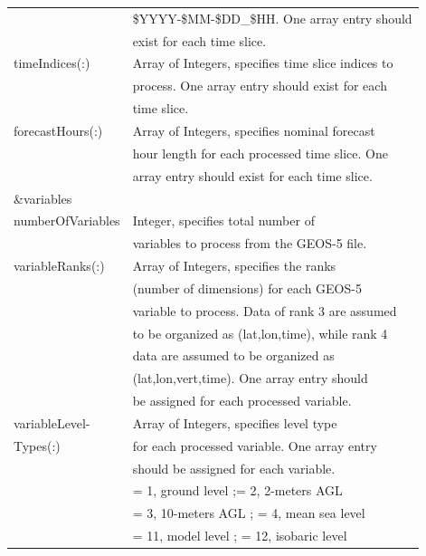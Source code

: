 \begin{tabular}{|l|l|}
& \$YYYY-\$MM-\$DD\_\$HH. One array entry should \\
& exist for each time slice. \\ \hline
timeIndices(:) & Array of Integers, specifies time slice indices to \\
& process. One array entry should exist for each \\
& time slice. \\ \hline
forecastHours(:) & Array of Integers, specifies nominal forecast \\ 
& hour length for each processed time slice. One \\
& array entry should exist for each time slice. \\ \hline 
\&variables & \\ \hline
numberOfVariables & Integer, specifies total number of \\
& variables to process from the GEOS-5 file. \\ \hline
variableRanks(:) & Array of Integers, specifies the ranks \\ 
 & (number of dimensions) for each GEOS-5 \\ 
 & variable to process. Data of rank 3 are assumed \\
 & to be organized as (lat,lon,time), while rank 4 \\
 & data are assumed to be organized as \\
 & (lat,lon,vert,time). One array entry should \\
 & be assigned for each processed variable. \\ \hline
 variableLevel- & Array of Integers, specifies level type \\
 Types(:)&for each processed variable. One array entry \\
 & should be assigned for each variable. \\
 & = 1, ground level ;= 2, 2-meters AGL \\
 & = 3, 10-meters AGL ; = 4, mean sea level \\
 & = 11, model level ; = 12, isobaric level \\ \hline
 \end{tabular} \\
 
